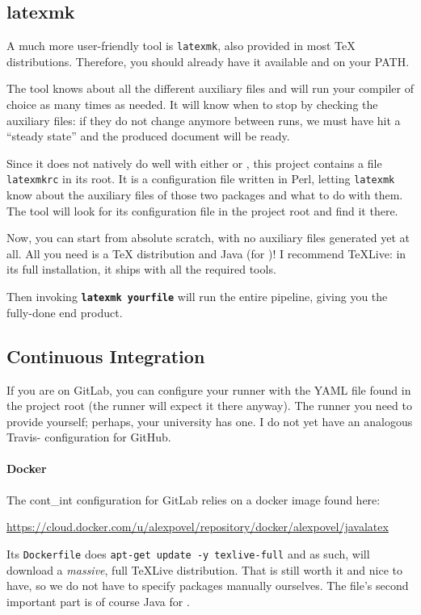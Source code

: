 \subsection{latexmk}
A much more user-friendly tool is \texttt{latexmk}, also provided in most \TeX{} distributions.
Therefore, you should already have it available and on your PATH.

The tool knows about all the different auxiliary files and will run your compiler of choice as many times as needed.
It will know when to stop by checking the auxiliary files: if they do not change anymore between runs, we must have hit a \enquote{steady state} and the produced document will be ready.

Since it does not natively do well with either  or , this project contains a file \texttt{latexmkrc} in its root.
It is a configuration file written in Perl, letting \texttt{latexmk} know about the auxiliary files of those two packages and what to do with them.
The tool will look for its configuration file in the project root and find it there.

Now, you can start from absolute scratch, with no auxiliary files generated yet at all.
All you need is a \TeX{} distribution and Java (for )!
I recommend TeXLive: in its full installation, it ships with all the required tools.

Then invoking \textbf{\texttt{latexmk yourfile}} will run the entire pipeline, giving you the fully-done end product.

\subsection{Continuous Integration}

If you are on GitLab, you can configure your runner with the YAML file found in the project root (the runner will expect it there anyway).
The runner you need to provide yourself; perhaps, your university has one.
I do not yet have an analogous Travis- configuration for GitHub.

\paragraph{Docker}
The \gls{cont_int} configuration for GitLab relies on a docker image found here:
\begin{center}
	\url{https://cloud.docker.com/u/alexpovel/repository/docker/alexpovel/javalatex}
\end{center}
Its \texttt{Dockerfile} does \texttt{apt-get update -y texlive-full} and as such, will download a \emph{massive}, full TeXLive distribution.
That is still worth it and nice to have, so we do not have to specify packages manually ourselves.
The file's second important part is of course Java for .

